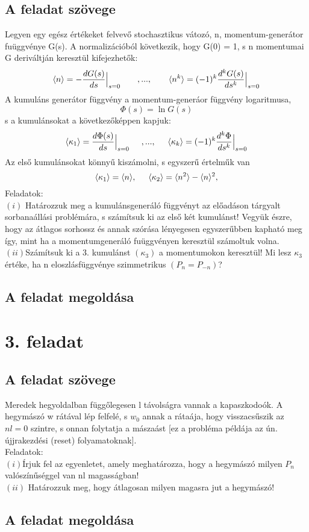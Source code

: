 \documentclass[12pt]{article}
\begin{document}
\subsection*{A feladat szövege}
Legyen egy egész értékeket felvevő stochasztikus vátozó, n, momentum-generátor fuüggvénye G(s). A normalizációból következik, hogy G(0) = 1, s n momentumai G deriváltján keresztül kifejezhetők:
$$\langle n\rangle = - \frac{dG(s)}{ds} \Big |_{\substack{ s=0 }}\hspace{0.7cm}, ...,\hspace{0.7cm} \langle n^k \rangle = (-1)^k\frac{d^kG(s)}{ds^k} \Big |_{\substack{ s=0 }}$$
A kumuláns generátor függvény a momentum-generáor függvény logaritmusa,
$$ \Phi (s) = \ln{G(s)}$$
s a kumulánsokat a következőképpen kapjuk:
$$\langle \kappa_1 \rangle = \frac{d\Phi(s)}{ds} \Big |_{\substack{ s=0 }} \hspace{0.5cm}, ..., \hspace{0.5cm} \langle \kappa_k \rangle = (-1)^k\frac{d^k\Phi}{ds^k}\Big |_{\substack{s = 0}}$$
Az első kumulánsokat könnyű kiszámolni, s egyszerű értelműk van
$$\langle \kappa_1\rangle = \langle n\rangle,  \hspace{0.5cm} \langle \kappa_2\rangle = \langle n^2\rangle -\langle n\rangle ^2,$$
Feladatok:\\
$(i)$ Határozzuk meg a kumulánsgeneráló függvényt az előadáson tárgyalt sorbanaállási problémára, s számítsuk ki az első két kumulánst! Vegyük észre, hogy az átlagos sorhossz és annak szórása lényegesen egyszerűbben kapható meg így, mint ha a momentumgeneráló fuüggvényen keresztül számoltuk volna.\\
$(ii)$Számítsuk ki a 3. kumulánst $(\kappa_3)$ a momentumokon keresztül! Mi lesz $\kappa_3$ értéke, ha n eloszlásfüggvénye szimmetrikus $ (P_n = P_{-n})$?
\subsection*{A feladat megoldása}


\newpage
\section*{3. feladat}
\subsection*{A feladat szövege}
Meredek hegyoldalban függőlegesen l távolságra vannak a kapaszkodoók. A hegymászó w rátával lép felfelé, s $w_0$ annak a rátaája, hogy visszacsűszik az $nl = 0$ szintre, s onnan folytatja a mászaást [ez a probléma példája az ún. újjrakezdési (reset) folyamatoknak].
\\Feladatok:\\
$(i)$Írjuk fel az egyenletet, amely meghatározza, hogy a hegymászó milyen $P_n$ valószínűséggel van nl magasságban!\\
$(ii)$ Határozzuk meg, hogy átlagosan milyen magasra jut a hegymászó!
\subsection*{A feladat megoldása}
\end{document}
